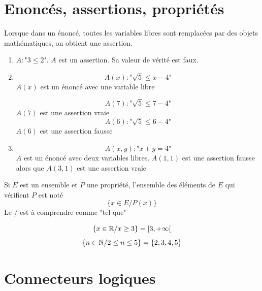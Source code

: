 \section{Enoncés, assertions, propriétés}
\newline


Lorsque dans un énoncé, toutes les variables libres sont remplacées par des objets mathématiques, on obtient une assertion.\newline

\begin{exemples}
\begin{enumerate}
\item $A : \text{"}3 \leq 2\text{"}$. $A$ est un assertion. Sa valeur de vérité est faux.
\item $$A(x) : \text{"}\sqrt{5} \leq x-4\text{"}$$ $A(x)$ est un énoncé avec une variable libre\newline

$$A(7) : \text{"} \sqrt{5} \leq 7 -4\text{"}$$ $A(7)$ est une assertion vraie
$$A(6) : \text{"} \sqrt{5} \leq 6 -4\text{"}$$ $A(6)$ est une assertion fausse
\item $$A(x,y) : \text{"} x+ y = 4\text{"}$$ $A$ est un énoncé avec deux variables libres. $A(1,1)$ est une assertion fausse alors que $A(3,1)$ est une assertion vraie
\end{enumerate}
\end{exemples}
\newline

Si $E$ est un ensemble et $P$ une propriété, l'ensemble des éléments de $E$ qui vérifient $P$ est noté $$\{x\in E / P(x)\}$$ Le $/$ est à comprendre comme "tel que"\newline

\begin{exemples}
$$\{x\in \mathbb{R} / x \geq 3\} = [3,+\infty[$$
$$\{n \in \mathbb{N} / 2 \leq n \leq 5\} = \{2,3,4,5\}$$
\end{exemples}
\section{Connecteurs logiques}
\newline

